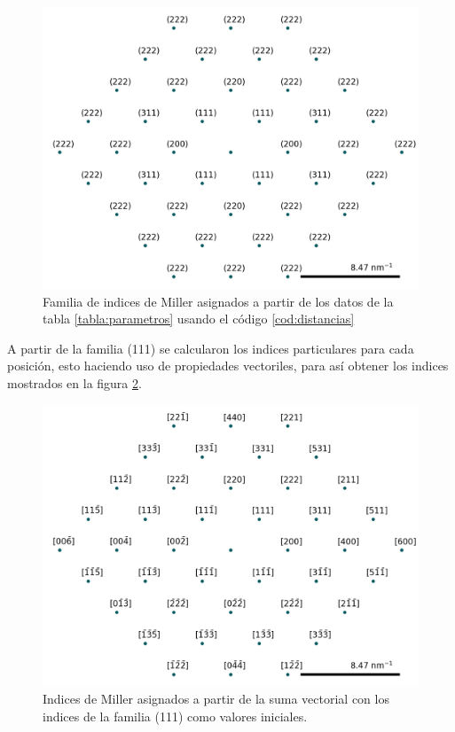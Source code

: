 \documentclass[reprint,amsmath,amssymb,aps,]{revtex4-2}
\begin{document}
\begin{figure}[H]
    \includegraphics[scale=0.45]{../Graphics/indices.png}
    \caption{Familia de indices de Miller asignados a partir de los datos de la tabla \ref{tabla:parametros} usando el código \ref{cod:distancias}}
    \label{fig:indicesmiller}
\end{figure}
A partir de la familia (111) se calcularon los indices particulares para cada posición, esto haciendo uso de propiedades vectoriles, para 
así obtener los indices mostrados en la figura \ref{fig:lattice}.
\begin{figure}[H]
    \includegraphics[scale=0.45]{../Graphics/lattice.png}
    \caption{Indices de Miller asignados a partir de la suma vectorial con los indices de la familia (111) como valores iniciales.}
    \label{fig:lattice}
    \end{figure}
\end{document}
